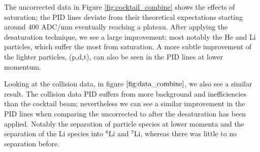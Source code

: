 \documentclass[review]{elsarticle}
\begin{document}
The uncorrected data in Figure \ref{fig:cocktail_combine} shows the effects of saturation; the PID lines deviate from their theoretical expectations starting around 400 ADC/mm eventually reaching a plateau. After applying the desaturation technique, we see a large improvement; most notably the He and Li particles, which suffer the most from saturation. A more subtle improvement of the lighter particles, (p,d,t), can also be seen in the PID lines at lower momentum.

 
Looking at the collision data, in figure $\ref{fig:data_combine}$, we also see a similar result. The collision data PID suffers from more background and inefficiencies than the cocktail beam; nevertheless we can see a similar improvement in the PID lines when comparing the uncorrected to after the desaturation has been applied. Notably the separation of particle species at lower momenta and the separation of the Li species into ${}^{6}$Li and ${}^{7}$Li, whereas there was little to no separation before. 
\end{document}
